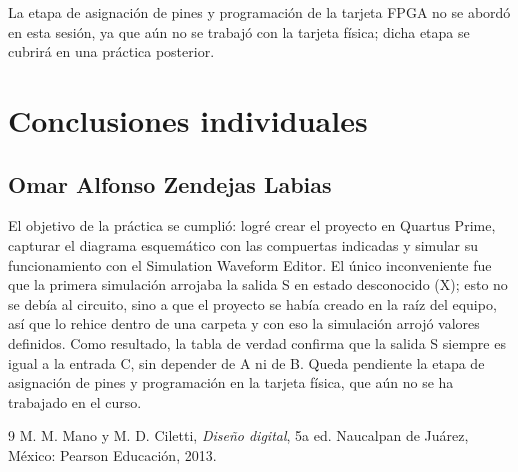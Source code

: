 La etapa de asignación de pines y programación de la tarjeta FPGA no se abordó en esta
sesión, ya que aún no se trabajó con la tarjeta física; dicha etapa se cubrirá en una
práctica posterior.

\section{Conclusiones individuales}

\subsection{Omar Alfonso Zendejas Labias}

El objetivo de la práctica se cumplió: logré crear el proyecto en Quartus Prime, capturar
el diagrama esquemático con las compuertas indicadas y simular su funcionamiento con el
Simulation Waveform Editor. El único inconveniente fue que la primera simulación
arrojaba la salida S en estado desconocido (X); esto no se debía al circuito, sino a que
el proyecto se había creado en la raíz del equipo, así que lo rehice dentro de una
carpeta y con eso la simulación arrojó valores definidos. Como resultado, la tabla de
verdad confirma que la salida S siempre es igual a la entrada C, sin depender de A ni de
B. Queda pendiente la etapa de asignación de pines y programación en la tarjeta física,
que aún no se ha trabajado en el curso.

\begin{thebibliography}{9}
 M. M. Mano y M. D. Ciletti, \emph{Diseño digital}, 5a ed.
  Naucalpan de Juárez, México: Pearson Educación, 2013.
\end{thebibliography}


